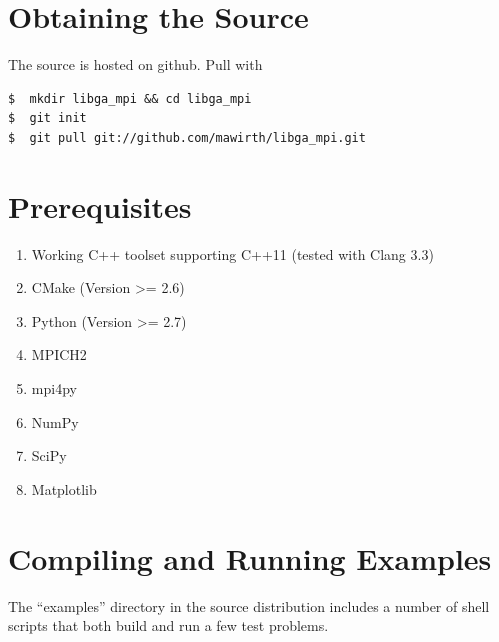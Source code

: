 \documentclass[12pt]{article}
\begin{document}
\section{Obtaining the Source}
The source is hosted on github. Pull with
\begin{lstlisting}[style=Bash]
$  mkdir libga_mpi && cd libga_mpi
$  git init
$  git pull git://github.com/mawirth/libga_mpi.git
\end{lstlisting}

\section{Prerequisites}
\begin{enumerate}
  \item Working C++ toolset supporting C++11 (tested with Clang 3.3)
  \item CMake (Version >= 2.6)
  \item Python (Version >= 2.7)
  \item MPICH2 
  \item mpi4py
  \item NumPy
  \item SciPy
  \item Matplotlib
\end{enumerate}

\section{Compiling and Running Examples}
The ``examples'' directory in the source distribution includes a number of shell scripts that both build and run a few test problems. 
\end{document}
